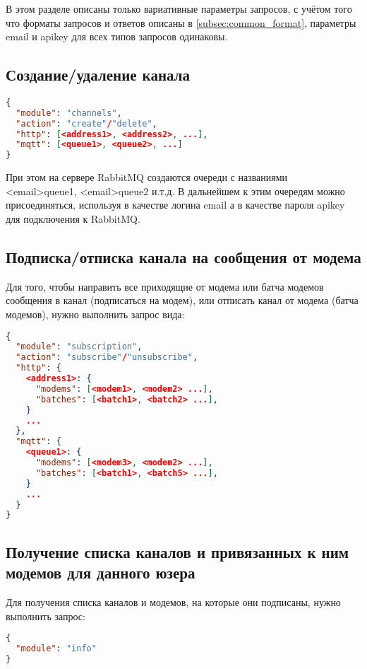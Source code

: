 В этом разделе описаны только вариативные параметры запросов, с учётом того что форматы запросов и ответов описаны в \ref{subsec:common_format}, параметры email и apikey для всех типов запросов одинаковы.

\subsection{Создание/удаление канала}

\begin{lstlisting}[language=json,firstnumber=1]
{
  "module": "channels",
  "action": "create"/"delete",
  "http": [<address1>, <address2>, ...],
  "mqtt": [<queue1>, <queue2>, ...]
}
\end{lstlisting}

При этом на сервере RabbitMQ создаются очереди с названиями <email>\textunderscore queue1, <email>\textunderscore queue2 и.т.д. В дальнейшем к этим очередям можно присоединяться, используя в качестве логина email а в качестве пароля apikey для подключения к RabbitMQ.

\subsection{Подписка/отписка канала на сообщения от модема}

Для того, чтобы направить все приходящие от модема или батча модемов сообщения в канал (подписаться на модем), или отписать канал от модема (батча модемов), нужно выполнить запрос вида:

\begin{lstlisting}[language=json,firstnumber=1]
{
  "module": "subscription",
  "action": "subscribe"/"unsubscribe",
  "http": {
    <address1>: {
      "modems": [<modem1>, <modem2> ...],
      "batches": [<batch1>, <batch2> ...],
    }
    ...
  },
  "mqtt": {
    <queue1>: {
      "modems": [<modem3>, <modem2> ...],
      "batches": [<batch1>, <batch5> ...],
    }
    ...
  }
}
\end{lstlisting}


\subsection{Получение списка каналов и привязанных к ним модемов для данного юзера}

Для получения списка каналов и модемов, на которые они подписаны, нужно выполнить запрос:

\begin{lstlisting}[language=json,firstnumber=1]
{
  "module": "info"
}
\end{lstlisting}

